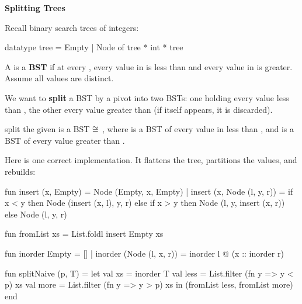 \newpage
{}

\textbf{Splitting Trees}

Recall binary search trees of integers:
\begin{codeblock}
  datatype tree = Empty | Node of tree * int * tree
\end{codeblock}
A  is a \textbf{BST} if at every , every value in
 is less than  and every value in  is greater. Assume all
values are distinct.

We want to \textbf{split} a BST by a pivot  into two BSTs: one holding
every value less than , the other every value greater than 
(if  itself appears, it is discarded).

\spec
  {split}
  {}
  {the given  is a BST}
  { $\cong$ , where  is a BST of every
  value in  less than , and  is a BST of every value
  greater than .}

Here is one correct implementation. It flattens the tree, partitions the values,
and rebuilds:
\begin{codeblock}
  fun insert (x, Empty) = Node (Empty, x, Empty)
    | insert (x, Node (l, y, r)) =
        if x < y then Node (insert (x, l), y, r)
        else if x > y then Node (l, y, insert (x, r))
        else Node (l, y, r)

  fun fromList xs = List.foldl insert Empty xs

  fun inorder Empty = []
    | inorder (Node (l, x, r)) = inorder l @ (x :: inorder r)

  fun splitNaive (p, T) =
    let
      val xs = inorder T
      val less = List.filter (fn y => y < p) xs
      val more = List.filter (fn y => y > p) xs
    in
      (fromList less, fromList more)
    end
\end{codeblock}

